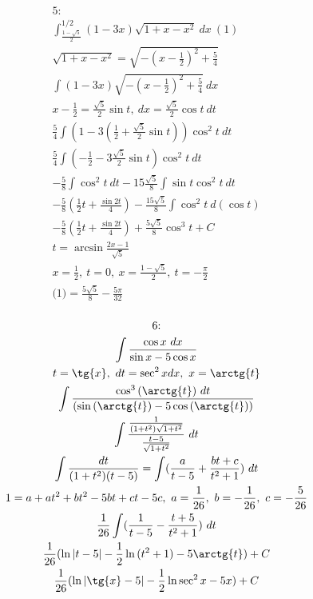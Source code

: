 \documentclass{report}
\begin{document}
\begin{multline}
    \text{5:}\\
    \int_{\frac{1 - \sqrt{5}}{2}}^{1/2} (1 - 3x) \sqrt{1 + x - x^{2}}\ dx\ (1)\\
    \sqrt{1 + x - x^{2}} = \sqrt{-(x - \frac{1}{2})^{2} + \frac{5}{4}}\\
    \int (1 - 3x) \sqrt{-(x - \frac{1}{2})^{2} + \frac{5}{4}}\ dx\\
    x - \frac{1}{2} = \frac{\sqrt{5}}{2} \sin{t},\ dx = \frac{\sqrt{5}}{2} \cos{t}\ dt\\
    \frac{5}{4} \int (1 - 3(\frac{1}{2} + \frac{\sqrt{5}}{2} \sin{t})) \cos^{2}{t}\ dt\\
    \frac{5}{4} \int (-\frac{1}{2} - 3\frac{\sqrt{5}}{2} \sin{t}) \cos^{2}{t}\ dt\\
    -\frac{5}{8} \int \cos^{2}{t}\ dt - 15 \frac{\sqrt{5}}{8}
    \int {\sin{t} \cos^{2}{t}\ dt}\\
    -\frac{5}{8}(\frac{1}{2}t + \frac{\sin{2t}}{4}) - 
    \frac{15\sqrt{5}}{8} \int \cos^{2}{t}\ d(\cos{t})\\
    - \frac{5}{8}(\frac{1}{2}t + \frac{\sin{2t}}{4}) + 
    \frac{5\sqrt{5}}{8} \cos^{3}{t} + C\\
    t = \arcsin{\frac{2x - 1}{\sqrt{5}}}\\
    x = \frac{1}{2},\ t = 0,\ x = \frac{1 - \sqrt{5}}{2},\ t = - \frac{\pi}{2}\\
    \text{(1)} = \frac{5 \sqrt{5}}{8} - \frac{5 \pi}{32}\\
\end{multline}

\begin{multline}
    \text{6:}\\
    \int \frac{\cos{x}\ dx}{\sin{x} - 5\cos{x}}\\
    t = \tg{x},\ dt = \sec^{2}{x} dx,\ x = \arctg{t}\\
    \int \frac{\cos^{3}{(\arctg{t})}\ dt}{(\sin{(\arctg{t})} - 5\cos{(\arctg{t})})}\\
    \int \frac{\frac{1}{(1 + t^2)\sqrt{1 + t^2}}}{\frac{t - 5}{\sqrt{1 + t^2}}}\ dt\\
    \int \frac{dt}{(1 + t^2) (t - 5)} = \int (\frac{a}{t - 5} + \frac{bt + c}{t^2 + 1})\ dt\\
    1 = a + at^2 + bt^2 - 5bt + ct - 5c,\ a = \frac{1}{26},\ b = -\frac{1}{26},\ c = -\frac{5}{26}\\
    \frac{1}{26} \int (\frac{1}{t - 5} - \frac{t + 5}{t^2 + 1})\ dt\\
    \frac{1}{26} (\ln{|t - 5|} - \frac{1}{2} \ln{(t^2 + 1)} - 5 \arctg{t}) + C\\
    \frac{1}{26} (\ln{|\tg{x} - 5|} - \frac{1}{2} \ln{\sec^{2}{x}} - 5x) + C\\
\end{multline}
\end{document}
